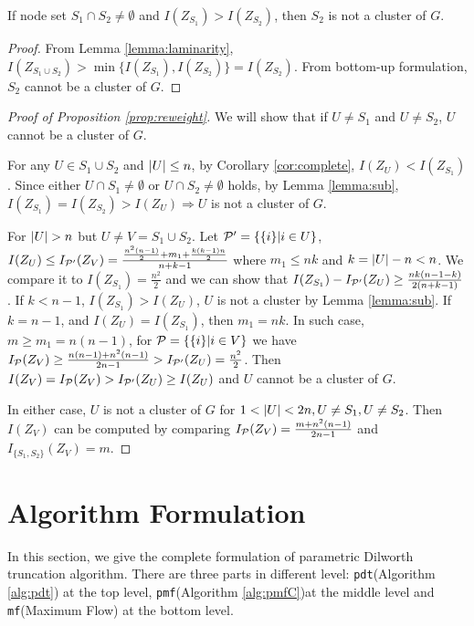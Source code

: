 \documentclass{article}
\begin{document}
\begin{lemma}\label{lemma:sub}
	If node set $S_1 \cap S_2 \neq \emptyset$ and $I(Z_{S_1}) > I(Z_{S_2})$, then $S_2$ is not a cluster of $G$.
\end{lemma}
\begin{proof}
	From Lemma \ref{lemma:laminarity},
	$I(Z_{S_1\cup S_2}) > \min\{I(Z_{S_1}), I(Z_{S_2})\} = I(Z_{S_2})$. From bottom-up formulation,  $S_2$ cannot be a cluster of $G$.
\end{proof}


\begin{proof}[Proof of Proposition \ref{prop:reweight}]
	We will show that if $U \neq S_1$ and $U \neq S_2$, $U$ cannot be a cluster of $G$.
	
For any $U \in S_1 \cup S_2 $ and $\abs{U} \leq n$, by Corollary \ref{cor:complete}, $I(Z_U) < I(Z_{S_1})$.
Since either $U \cap S_1 \neq \emptyset$ or $U \cap S_2 \neq \emptyset$ holds, by Lemma \ref{lemma:sub}, $I(Z_{S_1})= I(Z_{S_2}) > I(Z_U) \Rightarrow U$ is not a cluster of $G$.

For $\abs{U} > n$ but $U \neq V = S_1 \cup S_2$. Let $\P' = \{\{i\}| i\in U\}$, $I(Z_U) \leq I_{\P'}(Z_V) = \frac{\frac{n^2(n-1)}{2} + m_1 + \frac{k(k-1)n}{2}}{n+k-1}$ where $m_1 \leq nk$ and $k=\abs{U} - n < n$. 
We compare it to $I(Z_{S_1}) = \frac{n^2}{2}$ and we can show that $I(Z_{S_1}) - I_{\P'}(Z_U) \geq \frac{nk(n-1-k)}{2(n+k-1)}$. If $k<n-1$, $I(Z_{S_1})>I(Z_U)$, $U$ is not a cluster by Lemma \ref{lemma:sub}. If $k=n-1$, and $I(Z_U) = I(Z_{S_1})$, then $m_1=nk$. In such case, $m\geq m_1=n(n-1)$, for $\P=\{\{i\}|i\in V\}$ we have $I_{\P}(Z_V) \geq \frac{n(n-1)+n^2(n-1)}{2n-1} > I_{\P'}(Z_U)=\frac{n^2}{2}$. Then $I(Z_V) = I_{\P}(Z_V) > I_{\P'}(Z_U) \geq I(Z_U)$ and $U$ cannot be a cluster of $G$.

 In either case, $U$ is not a cluster of $G$ for $1<\abs{U}<2n, U \neq S_1, U\neq S_2$. Then $I(Z_V)$ can be computed by comparing $I_{\P}(Z_V) = \frac{m+n^2(n-1)}{2n-1}$ and $I_{\{S_1, S_2\}}(Z_V)=m$.

\end{proof}

\section{Algorithm Formulation}
In this section, we give the complete formulation of parametric Dilworth truncation algorithm. There are three parts in different level: \texttt{pdt}(Algorithm \ref{alg:pdt}) at the top level, \texttt{pmf}(Algorithm \ref{alg:pmfC})at the middle level and \texttt{mf}(Maximum Flow) at the bottom level.
\end{document}
